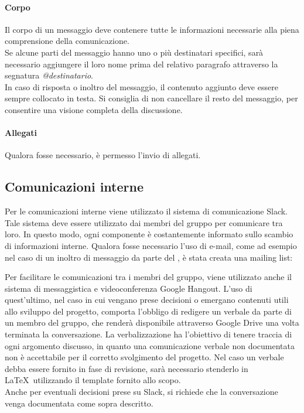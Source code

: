 \documentclass[../NormeDiProgetto.tex]{subfiles}
\begin{document}
					\paragraph{Corpo\\}
						Il corpo di un messaggio deve contenere tutte le informazioni
						necessarie alla piena comprensione della comunicazione.\\
						Se alcune parti del messaggio hanno uno o più destinatari specifici,
						sarà necessario aggiungere il loro nome	prima del relativo paragrafo
						attraverso la segnatura	\textit{@destinatario}.\\
						In caso di risposta o inoltro del messaggio, il contenuto aggiunto deve
						essere sempre collocato in testa.
						Si consiglia di non cancellare il resto del messaggio,
						per consentire una visione completa della discussione.
					\paragraph{Allegati\\}
						Qualora fosse necessario, è permesso l'invio di allegati.
			\subsection{Comunicazioni interne}
				Per le comunicazioni interne viene utilizzato il sistema di
				comunicazione Slack.\\
				Tale sistema deve essere utilizzato dai membri del gruppo
				per comunicare tra loro.
				In questo modo, ogni componente è costantemente informato sullo
				scambio di informazioni interne.
				Qualora fosse necessario l'uso di e-mail, come ad esempio nel caso di
				un inoltro di messaggio da parte del \responsabilediprogetto,
				è stata creata una mailing list:
				\begin{center}
					\mailinglist
				\end{center}
				Per facilitare le comunicazioni tra i membri del gruppo, viene
				utilizzato anche il sistema di messaggistica e videoconferenza
				Google Hangout.
				L'uso di quest'ultimo, nel caso in cui
				vengano prese decisioni	o emergano contenuti utili allo
				sviluppo del progetto, comporta l'obbligo di redigere un verbale
				da parte di un membro del gruppo, che renderà disponibile attraverso
				Google Drive una volta terminata la conversazione.
				La verbalizzazione ha l'obiettivo di tenere
				traccia di ogni argomento discusso, in
				quanto una comunicazione verbale non documentata non è
				accettabile per il corretto svolgimento del progetto. Nel caso un verbale
				debba essere fornito in fase di revisione, sarà necessario stenderlo in \LaTeX\
				utilizzando il template fornito allo scopo.\\
				Anche per eventuali decisioni prese su Slack, si richiede che la conversazione
				venga documentata come sopra descritto.
			
\end{document}
